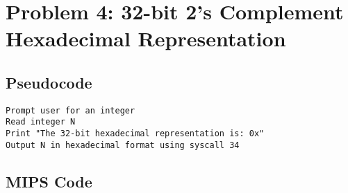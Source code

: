 \documentclass[a4paper]{article}
\begin{document}
\newpage
\section*{Problem 4: 32-bit 2’s Complement Hexadecimal Representation}
\subsection*{Pseudocode}
\begin{verbatim}
Prompt user for an integer
Read integer N
Print "The 32-bit hexadecimal representation is: 0x"
Output N in hexadecimal format using syscall 34
\end{verbatim}

\subsection*{MIPS Code}
\end{document}
